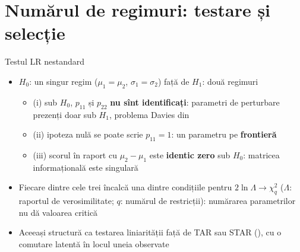 \section{Numărul de regimuri: testare și selecție}

\begin{frame}{Testul LR nestandard}
\itemsize{\small}
\begin{itemize}
    \item $H_0$: un singur regim ($\mu_1 = \mu_2$, $\sigma_1 = \sigma_2$) față de $H_1$: două regimuri
    \begin{itemize}
        \item (i) sub $H_0$, $p_{11}$ și $p_{22}$ \textbf{nu sînt identificați}: parametri de perturbare prezenți doar sub $H_1$, problema Davies din  
        \item (ii) ipoteza nulă se poate scrie $p_{11} = 1$: un parametru pe \textbf{frontieră}
        \item (iii) scorul în raport cu $\mu_2 - \mu_1$ este \textbf{identic zero} sub $H_0$: matricea informațională este singulară
    \end{itemize}
    \item Fiecare dintre cele trei încalcă una dintre condițiile pentru $2\ln\Lambda \to \chi^2_q$ ($\Lambda$: raportul de verosimilitate; $q$: numărul de restricții): numărarea parametrilor nu dă valoarea critică
    \item Aceeași structură ca testarea liniarității față de TAR sau STAR (), cu o comutare latentă în locul uneia observate
\end{itemize}
\end{frame}

